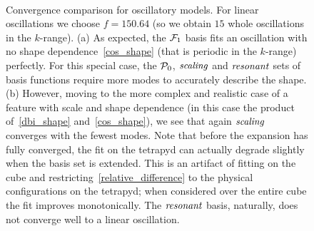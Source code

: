 \begin{figure}[!pth]
\centering     %
\\
\caption{
    Convergence comparison for oscillatory models.
    For linear oscillations we choose $f=150.64$ (so we obtain $15$ whole oscillations in the $k$-range).
    (a) As expected, the $\mathcal{F}_1$ basis fits an oscillation with
    no shape dependence~\eqref{cos_shape} (that is periodic in the $k$-range) perfectly.
    For this special case, the $\mathcal{P}_0$, $\textit{scaling}$ and $\textit{resonant}$ sets of basis functions require more modes
    to accurately describe the shape. (b) However, moving to the more complex and realistic case of a
    feature with scale and shape dependence (in this case the product of~\eqref{dbi_shape}
    and~\eqref{cos_shape}), we see that again $\textit{scaling}$ converges with the fewest modes.
    Note that before the expansion has fully converged, the fit on the tetrapyd
    can actually degrade slightly when the basis set is extended. This is an artifact
    of fitting on the cube and restricting~\eqref{relative_difference}
    to the physical configurations on the tetrapyd; when considered over the
    entire cube the fit improves monotonically.
    The $\textit{resonant}$ basis, naturally, does not converge well to a linear oscillation.
}\label{fig:recon_osc_dbiosc}
\end{figure}
